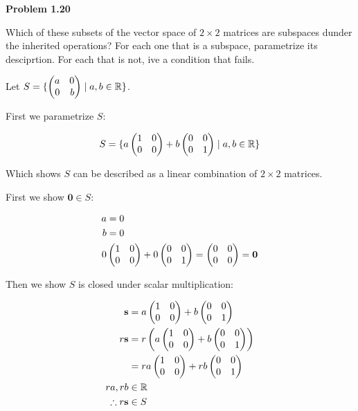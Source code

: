 \documentclass[12pt]{article}
\newenvironment{problem}[1][default]{
  \begin{framed}\begin{minipage}{0.97\textwidth}
  \setlength{\parskip}{4mm}
  {\bf Problem #1}
}{\end{minipage}\end{framed}}
\newenvironment{abc}{\begin{enumerate}[label={\bf(\alph*)}]}{\end{enumerate}}
\newcommand\m[2][]{
	\ifthenelse{\equal {#1} {}}
		{\begin{pmatrix*}[r]#2\end{pmatrix*}}
		{\left(\begin{array}{#1}#2\end{array}\right)}
}
\renewcommand{\vec}[1]{\mathbf{#1}}
\begin{document}
\begin{problem}[1.20]
	Which of these subsets of the vector space of $2 \times 2$ matrices are 
	subspaces dunder the inherited operations? For each one that is a 
	subspace, parametrize its desciprtion. For each that is not, ive a 
	condition that fails.
\end{problem}

\begin{abc}
\begin{item}
	Let $S = \{ \m{a & 0 \\ 0 & b} \mid a, b \in \mathbb{R} \}$.

	First we parametrize $S$:

	\begin{equation}
		\label{eqn:parametrized_S}
		S = \{ a \m{1 & 0 \\ 0 & 0} + b \m{0 & 0 \\ 0 & 1} \mid a, b \in \mathbb{R} \}
	\end{equation}

	Which shows $S$ can be described as a linear combination of $2 \times 2$ matrices.

	First we show $\vec{0} \in S$:

	\begin{equation}
	\begin{aligned}
		a &= 0 \\
		b &= 0 \\
		0 & \m{1 & 0 \\ 0 & 0} + 0 \m{0 & 0 \\ 0 & 1} = \m{0 & 0 \\ 0 & 0} = \vec{0}
	\end{aligned}
	\end{equation}

	Then we show $S$ is closed under scalar multiplication:

	\begin{equation}
	\begin{aligned}
		\vec{s} &= a \m{1 & 0 \\ 0 & 0} + b \m{0 & 0 \\ 0 & 1} \\
		r \vec{s} &= r \left( a \m{1 & 0 \\ 0 & 0} + b \m{0 & 0 \\ 0 & 1} \right) \\
		          &= r a \m{1 & 0 \\ 0 & 0} + r b \m{0 & 0 \\ 0 & 1} \\
		ra, rb &\in \mathbb{R} \\
		\therefore r \vec{s} &\in S
	\end{aligned}
	\end{equation}


\end{item}
\end{abc}
\end{document}
